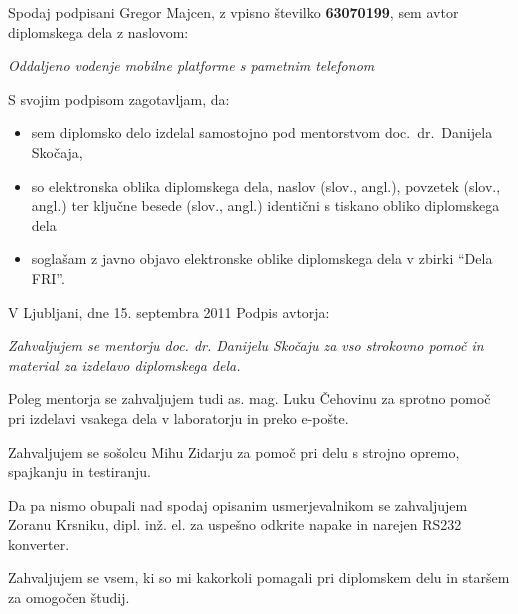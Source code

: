 \documentclass[a4paper, 12pt]{book}
\newcommand{\clearemptydoublepage}{\newpage{\pagestyle{empty}\cleardoublepage}}
\begin{document}
\vspace{1cm}
\noindent Spodaj podpisani Gregor Majcen,
z vpisno številko \textbf{63070199}, sem avtor  diplomskega dela z naslovom:
   
\vspace{0.5cm}
\emph{Oddaljeno vodenje mobilne platforme s pametnim telefonom}

\vspace{1.5cm}
\noindent S svojim podpisom zagotavljam, da:
\begin{itemize}
	\item sem diplomsko delo izdelal samostojno pod mentorstvom 
		doc.\ dr.\ Danijela Skočaja,

	\item	so elektronska oblika diplomskega dela, naslov (slov., angl.), povzetek (slov., angl.) ter ključne besede (slov., angl.) identični s tiskano obliko diplomskega dela
	\item soglašam z javno objavo elektronske oblike diplomskega dela v zbirki ``Dela FRI''.
\end{itemize}

\vspace{1cm}
\noindent V Ljubljani, dne 15. septembra 2011 \hfill Podpis avtorja:

\clearemptydoublepage

\thispagestyle{empty}\mbox{}\vfill\null\it%
Zahvaljujem se mentorju doc. dr. Danijelu Skočaju za vso strokovno pomoč in material za izdelavo diplomskega dela. 

Poleg mentorja se zahvaljujem tudi as. mag. Luku Čehovinu za sprotno pomoč pri izdelavi vsakega dela v laboratorju in preko e-pošte. 

Zahvaljujem se sošolcu Mihu Zidarju za pomoč pri delu s strojno opremo, spajkanju in testiranju.

Da pa nismo obupali nad spodaj opisanim usmerjevalnikom se zahvaljujem Zoranu Krsniku, dipl. inž. el. za uspešno odkrite napake in narejen RS232 konverter.

Zahvaljujem se vsem, ki so mi kakorkoli pomagali pri diplomskem delu in staršem za omogočen študij.
\rm\normalfont

\clearemptydoublepage

% 
\end{document}
